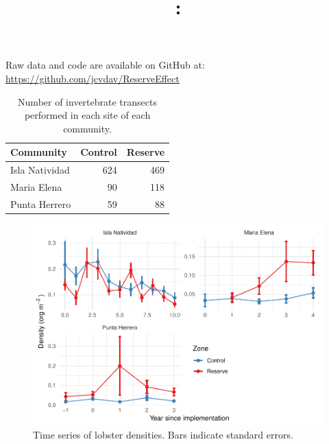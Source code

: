 \documentclass[utf8]{frontiers_suppmat} %
\begin{document}
\onecolumn
{}

\title[Supplementary Material]{{}:
\\ } %


\maketitle


Raw data and code are available on GitHub at: \url{https://github.com/jcvdav/ReserveEffect}

\begin{table}[t]

\caption{\label{tab:unnamed-chunk-2}Number of invertebrate transects performed in each site of each community.}
\centering
\begin{tabular}{lrr}
\toprule
Community & Control & Reserve\\
\midrule
Isla Natividad & 624 & 469\\
Maria Elena & 90 & 118\\
Punta Herrero & 59 & 88\\
\bottomrule
\end{tabular}
\end{table}

\begin{figure}
\centering
\includegraphics{SupplementaryMaterial_files/figure-latex/unnamed-chunk-3-1.pdf}
\caption{\label{fig:unnamed-chunk-3}Time series of lobster densities. Bars indicate standard errors.}
\end{figure}
\end{document}
